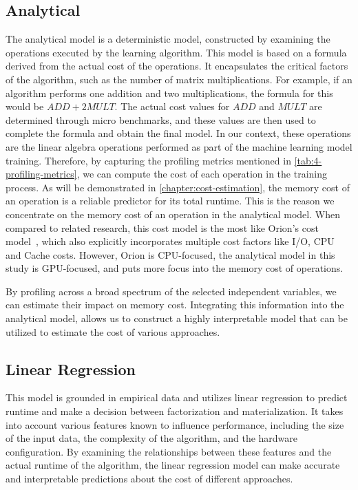 \subsection{Analytical}
The analytical model is a deterministic model, constructed by examining the operations executed by the learning algorithm. This model is based on a formula derived from the actual cost of the operations. It encapsulates the critical factors of the algorithm, such as the number of matrix multiplications. For example, if an algorithm performs one addition and two multiplications, the formula for this would be $ADD + 2MULT$. The actual cost values for $ADD$ and $MULT$ are determined through micro benchmarks, and these values are then used to complete the formula and obtain the final model. In our context, these operations are the linear algebra operations performed as part of the machine learning model training. Therefore, by capturing the profiling metrics mentioned in \autoref{tab:4-profiling-metrics}, we can compute the cost of each operation in the training process. As will be demonstrated in \autoref{chapter:cost-estimation}, the memory cost of an operation is a reliable predictor for its total runtime. This is the reason we concentrate on the memory cost of an operation in the analytical model. When compared to related research, this cost model is the most like Orion's cost model~\cite{orion_learning_gen_lin_models}, which also explicitly incorporates multiple cost factors like I/O, CPU and Cache costs. However, Orion is CPU-focused, the analytical model in this study is GPU-focused, and puts more focus into the memory cost of operations.

By profiling across a broad spectrum of the selected independent variables, we can estimate their impact on memory cost. Integrating this information into the analytical model, allows us to construct a highly interpretable model that can be utilized to estimate the cost of various approaches.

\subsection{Linear Regression}
This model is grounded in empirical data and utilizes linear regression to predict runtime and make a decision between factorization and materialization. It takes into account various features known to influence performance, including the size of the input data, the complexity of the algorithm, and the hardware configuration. By examining the relationships between these features and the actual runtime of the algorithm, the linear regression model can make accurate and interpretable predictions about the cost of different approaches.

